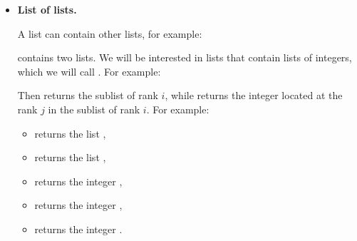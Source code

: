 \documentclass[11pt,class=report,crop=false]{standalone}
\begin{document}
\begin{cours}
\begin{itemize}
	 
  
  \item \textbf{List of lists.}
  
  
  A list can contain other lists, for example:  
  
   contains two lists. 
  We will be interested in lists that contain lists of integers, which we will call . For example:   
  
  Then  returns the sublist of rank $i$, while
   returns the integer located at the rank $j$ in the sublist of rank $i$. For example:
  \begin{itemize}
  \item {} returns the list \ci{[2,14,5]},
  \item {} returns the list \ci{[3,5,7]},
  \item {} returns the integer ,
  \item {} returns the integer ,
  \item {} returns the integer .
\end{itemize}

\end{itemize}
\end{cours}


\end{document}
